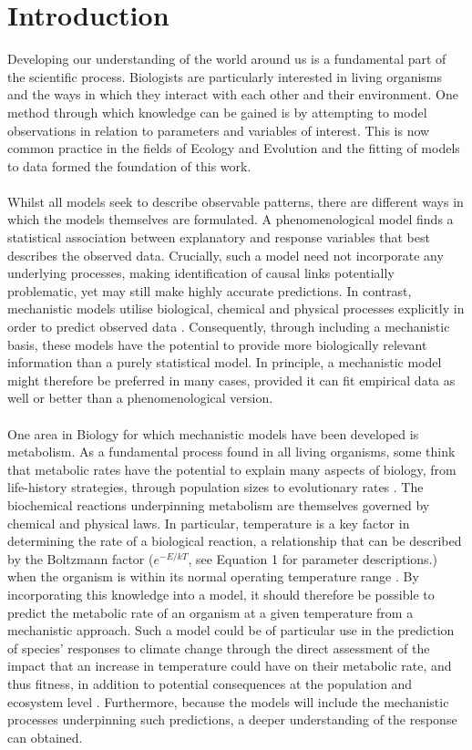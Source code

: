 \documentclass[11pt]{article}
\begin{document}
\section{Introduction}
Developing our understanding of the world around us is a fundamental part of the scientific process. Biologists are particularly interested in living organisms and the ways in which they interact with each other and their environment. One method through which knowledge can be gained is by attempting to model observations in relation to parameters and variables of interest. This is now common practice in the fields of Ecology and Evolution and the fitting of models to data formed the foundation of this work. 
\\
\\
Whilst all models seek to describe observable patterns, there are different ways in which the models themselves are formulated. A phenomenological model finds a statistical association between explanatory and response variables that best describes the observed data. Crucially, such a model need not incorporate any underlying processes, making identification of causal links potentially problematic, yet may still make highly accurate predictions. In contrast, mechanistic models utilise biological, chemical and physical processes explicitly in order to predict observed data \cite{brown2004toward, schoolfield1981non}. Consequently, through including a mechanistic basis, these models have the potential to provide more biologically relevant information than a purely statistical model. In principle, a mechanistic model might therefore be preferred in many cases, provided it can fit empirical data as well or better than a phenomenological version.
\\
\\
One area in Biology for which mechanistic models have been developed is metabolism. As a fundamental process found in all living organisms, some think that metabolic rates have the potential to explain many aspects of biology, from life-history strategies, through population sizes to evolutionary rates \cite{brown2004toward}. The biochemical reactions underpinning metabolism are themselves governed by chemical and physical laws. In particular, temperature is a key factor in determining the rate of a biological reaction, a relationship that can be described by the Boltzmann factor (\begin{math}e^{-E/kT}\end{math}, see Equation 1 for parameter descriptions.) when the organism is within its normal operating temperature range \cite{schoolfield1981non, gillooly2001effects}. By incorporating this knowledge into a model, it should therefore be possible to predict the metabolic rate of an organism at a given temperature from a mechanistic approach. Such a model could be of particular use in the prediction of species' responses to climate change through the direct assessment of the impact that an increase in temperature could have on their metabolic rate, and thus fitness, in addition to potential consequences at the population and ecosystem level \cite{thomas2012global, brown2004toward}. Furthermore, because the models will include the mechanistic processes underpinning such predictions, a deeper understanding of the response can obtained.
\end{document}
